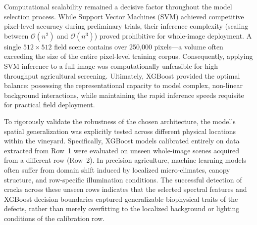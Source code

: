 
\medskip\noindent
Computational scalability remained a decisive factor throughout the model selection process. While Support Vector Machines (SVM) achieved competitive pixel-level accuracy during preliminary trials, their inference complexity (scaling between $\mathcal{O}(n^2)$ and $\mathcal{O}(n^3)$) proved prohibitive for whole-image deployment. A single $512 \times 512$ field scene contains over 250,000 pixels---a volume often exceeding the size of the entire pixel-level training corpus. Consequently, applying SVM inference to a full image was computationally unfeasible for high-throughput agricultural screening. Ultimately, XGBoost provided the optimal balance: possessing the representational capacity to model complex, non-linear background interactions, while maintaining the rapid inference speeds requisite for practical field deployment.

\medskip\noindent
To rigorously validate the robustness of the chosen architecture, the model's spatial generalization was explicitly tested across different physical locations within the vineyard. Specifically, XGBoost models calibrated entirely on data extracted from Row~1 were evaluated on unseen whole-image scenes acquired from a different row (Row~2). In precision agriculture, machine learning models often suffer from domain shift induced by localized micro-climates, canopy structure, and row-specific illumination conditions. The successful detection of cracks across these unseen rows indicates that the selected spectral features and XGBoost decision boundaries captured generalizable biophysical traits of the defects, rather than merely overfitting to the localized background or lighting conditions of the calibration row.

